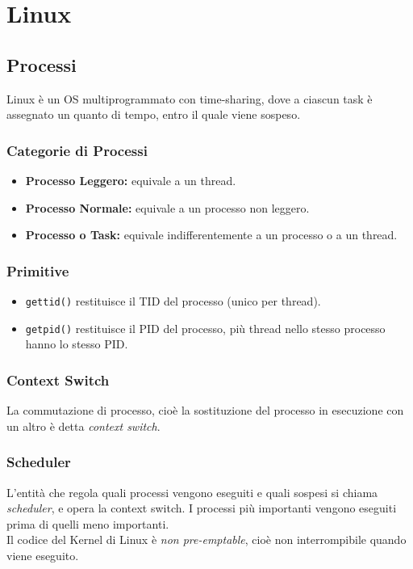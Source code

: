 \documentclass[10pt,a4paper]{article}
\newcommand{\code}{\texttt}
\begin{document}
\section{Linux}
\subsection{Processi}
Linux è un OS multiprogrammato con time-sharing, dove a ciascun task è assegnato un quanto di tempo, entro il quale viene sospeso.

\subsubsection{Categorie di Processi}
\begin{itemize}
    \item \textbf{Processo Leggero:} equivale a un thread.
    \item \textbf{Processo Normale:} equivale a un processo non leggero.
    \item \textbf{Processo o Task:} equivale indifferentemente a un processo o a un thread.
\end{itemize}

\subsubsection{Primitive}
\begin{itemize}
    \item \code{gettid()} restituisce il TID del processo (unico per thread).
    \item \code{getpid()} restituisce il PID del processo, più thread nello stesso processo hanno lo stesso PID.
\end{itemize}

\subsubsection{Context Switch}
La commutazione di processo, cioè la sostituzione del processo in esecuzione con un altro è detta \emph{context switch}.

\subsubsection{Scheduler}
L'entità che regola quali processi vengono eseguiti e quali sospesi si chiama \emph{scheduler}, e opera la context switch. I processi più importanti vengono eseguiti prima di quelli meno importanti.\\
Il codice del Kernel di Linux è \emph{non pre-emptable}, cioè non interrompibile quando viene eseguito.
\end{document}
